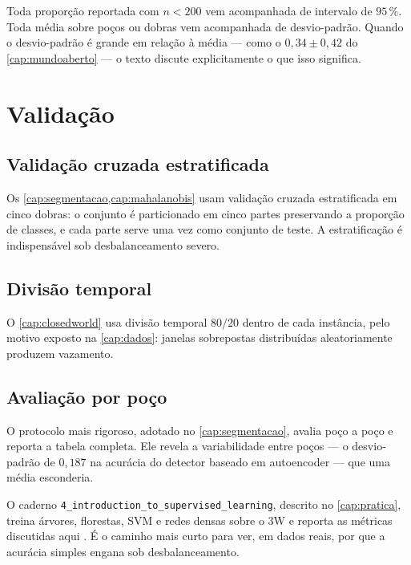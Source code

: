 \begin{destaque}
Toda proporção reportada com $n < 200$ vem acompanhada de intervalo de $95\,\%$. Toda
média sobre poços ou dobras vem acompanhada de desvio-padrão. Quando o desvio-padrão é
grande em relação à média --- como o $0{,}34 \pm 0{,}42$ do \cref{cap:mundoaberto} ---
o texto discute explicitamente o que isso significa.
\end{destaque}

\section{Validação}

\subsection{Validação cruzada estratificada}

Os \cref{cap:segmentacao,cap:mahalanobis} usam validação cruzada estratificada em cinco
dobras: o conjunto é particionado em cinco partes preservando a proporção de classes,
e cada parte serve uma vez como conjunto de teste. A estratificação é indispensável
sob desbalanceamento severo.

\subsection{Divisão temporal}

O \cref{cap:closedworld} usa divisão temporal $80/20$ dentro de cada instância, pelo
motivo exposto na \cref{cap:dados}: janelas sobrepostas distribuídas aleatoriamente
produzem vazamento.

\subsection{Avaliação por poço}

O protocolo mais rigoroso, adotado no \cref{cap:segmentacao}, avalia poço a poço e
reporta a tabela completa. Ele revela a variabilidade entre poços --- o desvio-padrão
de $0{,}187$ na acurácia do detector baseado em autoencoder --- que uma média
esconderia.

\begin{destaque}[Prática]
O caderno \texttt{4\_introduction\_to\_supervised\_learning}, descrito no
\cref{cap:pratica}, treina árvores, florestas, SVM e redes densas sobre o 3W e reporta as
métricas discutidas aqui \citep{Lopes2026Intro3W}. É o caminho mais curto para ver, em
dados reais, por que a acurácia simples engana sob desbalanceamento.
\end{destaque}


